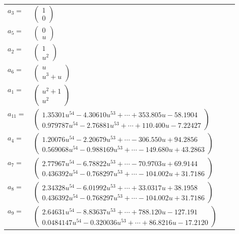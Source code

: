 \documentclass[1p]{elsarticle_modified}
\theoremstyle{definition}
\begin{document}
\begin{tabular}{m{7pt} m{180pt} m{7pt} m{180pt} }
\flushright $a_{3}=$&$\begin{pmatrix}1\\0\end{pmatrix}$ \\
\flushright $a_{5}=$&$\begin{pmatrix}0\\u\end{pmatrix}$ \\
\flushright $a_{2}=$&$\begin{pmatrix}1\\u^2\end{pmatrix}$ \\
\flushright $a_{6}=$&$\begin{pmatrix}u\\u^3+u\end{pmatrix}$ \\
\flushright $a_{1}=$&$\begin{pmatrix}u^2+1\\u^2\end{pmatrix}$ \\
\flushright $a_{11}=$&$\begin{pmatrix}1.35301 u^{54}-4.30610 u^{53}+\cdots+353.805 u-58.1904\\0.979787 u^{54}-2.76881 u^{53}+\cdots+110.400 u-7.22427\end{pmatrix}$ \\
\flushright $a_{4}=$&$\begin{pmatrix}1.20076 u^{54}-2.20679 u^{53}+\cdots-306.550 u+94.2856\\0.569068 u^{54}-0.988169 u^{53}+\cdots-149.680 u+43.2863\end{pmatrix}$ \\
\flushright $a_{7}=$&$\begin{pmatrix}2.77967 u^{54}-6.78822 u^{53}+\cdots-70.9703 u+69.9144\\0.436392 u^{54}-0.768297 u^{53}+\cdots-104.002 u+31.7186\end{pmatrix}$ \\
\flushright $a_{8}=$&$\begin{pmatrix}2.34328 u^{54}-6.01992 u^{53}+\cdots+33.0317 u+38.1958\\0.436392 u^{54}-0.768297 u^{53}+\cdots-104.002 u+31.7186\end{pmatrix}$ \\
\flushright $a_{9}=$&$\begin{pmatrix}2.64631 u^{54}-8.83637 u^{53}+\cdots+788.120 u-127.191\\0.0484147 u^{54}-0.320036 u^{53}+\cdots+86.8216 u-17.2120\end{pmatrix}$ \\

\end{tabular}
\end{document}
